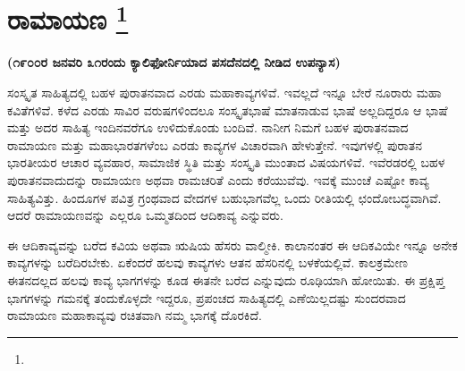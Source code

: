 
\chapter[ರಾಮಾಯಣ ]{ರಾಮಾಯಣ \protect\footnote{}}

\vskip 3pt

\centerline{\textbf{(೧೯೦೦ರ ಜನವರಿ ೩೧ರಂದು ಕ್ಯಾಲಿಫೋರ್ನಿಯಾದ ಪಸದೆನದಲ್ಲಿ ನೀಡಿದ ಉಪನ್ಯಾಸ)}}

\vskip 5pt

ಸಂಸ್ಕೃತ ಸಾಹಿತ್ಯದಲ್ಲಿ ಬಹಳ ಪುರಾತನವಾದ ಎರಡು ಮಹಾಕಾವ್ಯಗಳಿವೆ. ಇವಲ್ಲದೆ ಇನ್ನೂ ಬೇರೆ ನೂರಾರು ಮಹಾ ಕವಿತೆಗಳಿವೆ. ಕಳೆದ ಎರಡು ಸಾವಿರ ವರುಷಗಳಿಂದಲೂ ಸಂಸ್ಕೃತಭಾಷೆ ಮಾತನಾಡುವ ಭಾಷೆ ಅಲ್ಲದಿದ್ದರೂ ಆ ಭಾಷೆ ಮತ್ತು ಅದರ ಸಾಹಿತ್ಯ ಇಂದಿನವರೆಗೂ ಉಳಿದುಕೊಂಡು ಬಂದಿವೆ. ನಾನೀಗ ನಿಮಗೆ ಬಹಳ ಪುರಾತನವಾದ ರಾಮಾಯಣ ಮತ್ತು ಮಹಾಭಾರತಗಳೆಂಬ ಎರಡು ಕಾವ್ಯಗಳ ವಿಚಾರವಾಗಿ ಹೇಳುತ್ತೇನೆ. ಇವುಗಳಲ್ಲಿ ಪುರಾತನ ಭಾರತೀಯರ ಆಚಾರ ವ್ಯವಹಾರ, ಸಾಮಾಜಿಕ ಸ್ಥಿತಿ ಮತ್ತು ಸಂಸ್ಕೃತಿ ಮುಂತಾದ ವಿಷಯಗಳಿವೆ. ಇವೆರಡರಲ್ಲಿ ಬಹಳ ಪುರಾತನವಾದುದನ್ನು ರಾಮಾಯಣ ಅಥವಾ ರಾಮಚರಿತೆ ಎಂದು ಕರೆಯುವೆವು. ಇವಕ್ಕೆ ಮುಂಚೆ ಎಷ್ಟೋ ಕಾವ್ಯ ಸಾಹಿತ್ಯವಿತ್ತು. ಹಿಂದೂಗಳ ಪವಿತ್ರ ಗ್ರಂಥವಾದ ವೇದಗಳ ಬಹುಭಾಗವೆಲ್ಲ ಒಂದು ರೀತಿಯಲ್ಲಿ ಛಂದೋಬದ್ಧವಾಗಿವೆ. ಆದರೆ ರಾಮಾಯಣವನ್ನು ಎಲ್ಲರೂ ಒಮ್ಮತದಿಂದ ಆದಿಕಾವ್ಯ ಎನ್ನುವರು.

\vskip 3pt

ಈ ಆದಿಕಾವ್ಯವನ್ನು ಬರೆದ ಕವಿಯ ಅಥವಾ ಋಷಿಯ ಹೆಸರು ವಾಲ್ಮೀಕಿ. ಕಾಲಾನಂತರ ಈ ಆದಿಕವಿಯೇ ಇನ್ನೂ ಅನೇಕ ಕಾವ್ಯಗಳನ್ನು ಬರೆದಿರಬೇಕು. ಏಕೆಂದರೆ ಹಲವು ಕಾವ್ಯಗಳು ಆತನ ಹೆಸರಿನಲ್ಲಿ ಬಳಕೆಯಲ್ಲಿವೆ. ಕಾಲಕ್ರಮೇಣ ಈತನದಲ್ಲದ ಹಲವು ಕಾವ್ಯ ಭಾಗಗಳನ್ನು ಕೂಡ ಈತನೇ ಬರೆದ ಎನ್ನುವುದು ರೂಢಿಯಾಗಿ ಹೋಯಿತು. ಈ ಪ್ರಕ್ಷಿಪ್ತ ಭಾಗಗಳನ್ನು ಗಮನಕ್ಕೆ ತಂದುಕೊಳ್ಳದೇ ಇದ್ದರೂ, ಪ್ರಪಂಚದ ಸಾಹಿತ್ಯದಲ್ಲಿ ಎಣೆಯಿಲ್ಲದಷ್ಟು ಸುಂದರವಾದ ರಾಮಾಯಣ ಮಹಾಕಾವ್ಯವು ರಚಿತವಾಗಿ ನಮ್ಮ ಭಾಗಕ್ಕೆ ದೊರಕಿದೆ.

\vskip 3pt

